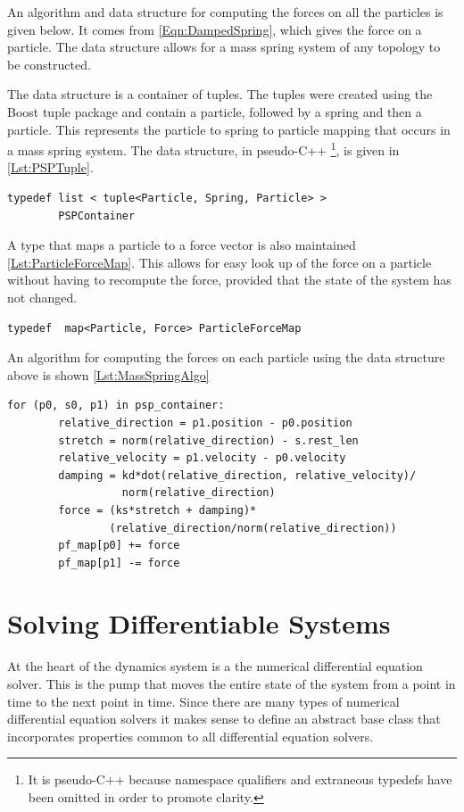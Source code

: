 An algorithm and data structure for computing the forces on all the particles is
given below. It comes from \ref{Eqn:DampedSpring}, which gives the force on a
particle. The data structure allows for a mass spring system of any topology to
be constructed. 

The data structure is a container of tuples. The tuples were created using the
Boost tuple package and contain a particle, followed by a spring and then a
particle. This represents the particle to spring to particle mapping that occurs
in a mass spring system. The data structure, in pseudo-C++ \footnote{It is
pseudo-C++ because namespace qualifiers and extraneous typedefs have been
omitted in order to promote clarity.}, is given in \ref{Lst:PSPTuple}. 

\lstset{language=C++}
\begin{lstlisting}[caption={Particle Spring Particle Tuple},label={Lst:PSPTuple}]
    typedef list < tuple<Particle, Spring, Particle> > 
        PSPContainer
\end{lstlisting}

A type that maps a particle to a force vector is also maintained
\ref{Lst:ParticleForceMap}. This allows for easy look up of the force on a
particle without having to recompute the force, provided that the state of the
system has not changed.

\lstset{language=C++}
\begin{lstlisting}[caption={Particle Force Map},label={Lst:ParticleForceMap}]
    typedef  map<Particle, Force> ParticleForceMap
\end{lstlisting}

An algorithm for computing the forces on each particle using the data structure
above is shown \ref{Lst:MassSpringAlgo}
\lstset{language=Python} 
\begin{lstlisting}[basicstyle={\ttfamily \footnotesize}, caption={Force Calculation for Mass Spring System}, label={Lst:MassSpringAlgo}]
    for (p0, s0, p1) in psp_container:
        relative_direction = p1.position - p0.position
        stretch = norm(relative_direction) - s.rest_len
        relative_velocity = p1.velocity - p0.velocity
        damping = kd*dot(relative_direction, relative_velocity)/
                  norm(relative_direction)
        force = (ks*stretch + damping)*
                (relative_direction/norm(relative_direction))
        pf_map[p0] += force
        pf_map[p1] -= force
\end{lstlisting}	

\section{Solving Differentiable Systems}
At the heart of the dynamics system is a the numerical differential equation
solver. This is the pump that moves the entire state of the system from a point
in time to the next point in time. Since there are many types of numerical 
differential equation solvers it makes sense to define an abstract base class
that incorporates properties common to all differential equation solvers.

